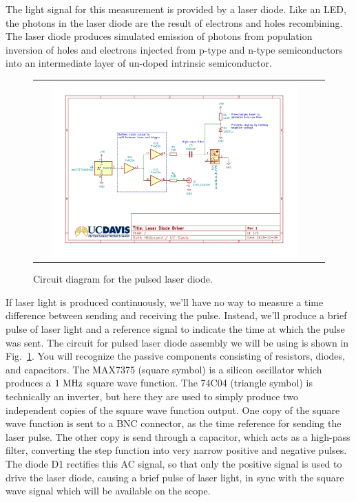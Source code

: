 The light signal for this measurement is provided by a laser diode.
Like an LED, the photons in the laser diode are the result of
electrons and holes recombining.  The laser diode produces simulated
emission of photons from population inversion of holes and electrons
injected from p-type and n-type semiconductors into an intermediate
layer of un-doped intrinsic semiconductor.

\begin{figure}[htbp]
\begin{center}
\begin{tabular}{cc}
\includegraphics[width=0.9\textwidth]{figs/labs/c_air/cair_diodedriver}
\end{tabular}
\end{center}
\caption{\label{fig:clasercirc} Circuit diagram for the pulsed laser diode.}
\end{figure}

If laser light is produced continuously, we'll have no way to measure
a time difference between sending and receiving the pulse.  Instead,
we'll produce a brief pulse of laser light and a reference signal to
indicate the time at which the pulse was sent.  The circuit for pulsed
laser diode assembly we will be using is shown in
Fig.~\ref{fig:clasercirc}.  You will recognize the passive components
consisting of resistors, diodes, and capacitors.  The MAX7375 (square
symbol) is a silicon oscillator which produces a $1~\rm MHz$ square
wave function.  The 74C04 (triangle symbol) is technically an
inverter, but here they are used to simply produce two independent
copies of the square wave function output.  One copy of the square
wave function is sent to a BNC connector, as the time reference for
sending the laser pulse.  The other copy is send through a capacitor,
which acts as a high-pass filter, converting the step function into
very narrow positive and negative pulses.  The diode D1 rectifies this
AC signal, so that only the positive signal is used to drive the laser
diode, causing a brief pulse of laser light, in sync with the square
wave signal which will be available on the scope.

